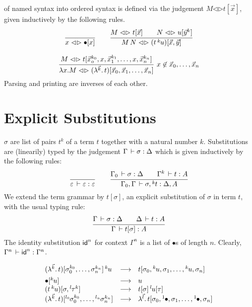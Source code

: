 \documentclass[a4paper]{article}
\newcommand{\oann}[1]{{}^{#1}\kern-0.15ex}
\newcommand{\ovar}{\mathord{\bullet}}
\newcommand{\oapp}[1]{\,\oann{#1}}
\newcommand{\olam}[1]{\lambda^{#1}.\,}
\newcommand{\lrhd}{\mathrel{\mathord{\lhd}\mathord{\rhd}}}
\newcommand{\osyn}[3]{#1 \lrhd \esubst{#2}{#3}}
\newcommand{\osynp}[3]{\osyn{#1}{(#2)}{#3}}
\renewcommand{\esubst}[2]{#1[#2]}
\newcommand{\esubstp}[2]{\esubst{(#1)}{#2}}
\renewcommand{\cempty}{\varepsilon}
\renewcommand{\sempty}{\varepsilon}
\begin{document}
 of named syntax into ordered syntax is defined via the
judgement $\osyn M t {\vec x}$, given inductively by the following rules.
\begin{gather*}
  \ru{}{\osyn x \ovar x}
\qquad
  \ru{\osyn M t {\vec x} \qquad
      \osyn N u {\vec y^k}
    }{\osynp {M\,N} {t \oapp k u} {\vec x, \vec y}}
\\[2ex]
  \rux{\osyn M t {\vec x_o^{k_0},x,\vec x_1^{k_1},\dots,x,\vec x_n^{k_n}}
     }{\osynp {\lambda x.M} {\olam {\vec k} t}
         {\vec x_0,\vec x_1,\dots,\vec x_n}
    }{x \not\in \vec x_0,\dots,\vec x_n}
\end{gather*}
Parsing and printing are inverses of each other.


\section{Explicit Substitutions}

 $\sigma$ are list of pairs $t^k$ of a term $t$ together
with a natural number $k$.  Substitutions are (linearily) typed by the judgement
$\Gamma \,\vdash \sigma : \Delta$ which is given inductively by the
following rules:
\begin{gather*}
  \ru{
    }{\cempty \der \sempty : \cempty}
\qquad
  \ru{\Gamma_0 \der \sigma : \Delta \qquad
      \Gamma^k \der t : A
    }{\Gamma_0,\Gamma \der \sigma, \oann k t : \Delta,A}
\end{gather*}
We extend the term grammar by $\esubst t \sigma$, an explicit substitution of
$\sigma$ in term $t$, with the usual typing rule:
\begin{gather*}
  \ru{\Gamma \der \sigma : \Delta \qquad
      \Delta \der t : A
    }{\Gamma \der \esubst t \sigma : A}
\end{gather*}
The identity substitution $\mathsf{id}^n$ for context $\Gamma^n$ is a list of
$\ovar$s of length $n$.  Clearly, $\Gamma^n \,\vdash \mathsf{id}^n : \Gamma^n$.

\[
\begin{array}{lll}
  \esubstp {\olam {\vec k} t} {\sigma_0^{k_0},\dots,\sigma_n^{k_n}} \oapp k u
  & \red & \esubst t {\sigma_0,\oann k u,\sigma_1, \dots, \oann k u,\sigma_n}
\\[1ex]
  \esubst \ovar {\oann k u}
  & \red & u
\\
  \esubstp {t \oapp k u} {\sigma,\oann l {\tau^k}}
  & \red & \esubst t \sigma \oapp l \esubst u \tau
\\
  \esubstp {\olam {\vec k} t} {\oann{l_0}{\sigma_0^{k_0}},\dots,\oann{l_n}{\sigma_n^{k_n}}}
  & \red & \olam {\vec l} \esubst t {\sigma_0,\oann 1
    \ovar,\sigma_1,\dots,\oann 1 \ovar,\sigma_n}
\end{array}
\]
\end{document}
